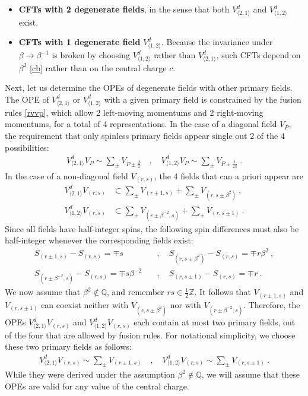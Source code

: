 \documentclass[12pt, a4paper]{article}
\theoremstyle{break}
\begin{document}
\begin{itemize}
 \item \textbf{CFTs with 2 degenerate fields}, in the sense that both $V^d_{\langle 2,1\rangle}$ and $V^d_{\langle 1,2\rangle}$ exist. 
 \item \textbf{CFTs with 1 degenerate field} $V^d_{\langle 1,2\rangle}$. Because the invariance under $\beta\to \beta^{-1}$ is broken by choosing $V^d_{\langle 1,2\rangle}$ rather than $V^d_{\langle 2,1\rangle}$, such CFTs depend on $\beta^2$ \eqref{cb} rather than on the central charge $c$. 
\end{itemize}
Next, let us determine the OPEs of degenerate fields with other primary fields.
The OPE of $V^d_{\langle 2,1\rangle}$ or $V^d_{\langle 1,2\rangle}$ with a given primary field is constrained by the fusion rules \eqref{rvvp}, which allow 2 left-moving momentums and 2 right-moving momentums, for a total of 4 representations.  In the case of a diagonal field $V_P$, the requirement that only spinless primary fields appear single out 2 of the 4 possibilities:
\begin{align}
 \boxed{V^d_{\langle 2,1\rangle} V_P \sim \sum_\pm V_{P\pm\frac{\beta}{2}}} \quad , \quad \boxed{V^d_{\langle 1,2\rangle} V_P \sim \sum_\pm V_{P\pm\frac{1}{2\beta}}} \ . 
 \label{vpope}
\end{align}
In the case of a non-diagonal field $V_{(r,s)}$, the 4 fields that can a priori appear are
\begin{align}
 V^d_{\langle 2,1\rangle}V_{(r,s)} &\subset \sum_\pm V_{(r\pm 1,s)} + \sum_\pm V_{(r,s\pm \beta^2)}\ ,
 \label{vtovrs}
 \\
 V^d_{\langle 1,2\rangle}V_{(r,s)} &\subset \sum_\pm V_{(r\pm \beta^{-2},s)} + \sum_\pm V_{(r,s\pm 1)}\ .
 \label{votvrs}
\end{align}
Since all fields have half-integer spins, the following spin differences must also be half-integer whenever the corresponding fields exist: 
\begin{align}
 S_{(r\pm 1,s)} - S_{(r,s)} = \mp s &\quad , \quad S_{(r,s\pm \beta^2)} - S_{(r,s)} = \mp r\beta^2\ ,
 \label{sdiff1}
 \\
 S_{(r\pm \beta^{-2},s)} - S_{(r,s)} = \mp s\beta^{-2} &\quad , \quad S_{(r,s\pm 1)} - S_{(r,s)} = \mp r\ . 
 \label{sdiff2}
\end{align}
We now assume that $\beta^2\notin \mathbb{Q}$, and remember $rs\in\frac12\mathbb{Z}$. It follows that $V_{(r\pm 1,s)}$ and $V_{(r,s\pm 1)}$ can coexist neither with $V_{(r,s\pm \beta^2)}$ nor with $V_{(r\pm \beta^{-2},s)}$. Therefore, the OPEs $V^d_{\langle 2,1\rangle}V_{(r,s)}$ and $V^d_{\langle 1,2\rangle}V_{(r,s)}$ each contain at most two primary fields, out of the four that are allowed by fusion rules. For notational simplicity, we choose these two primary fields as follows: 
\begin{align}
 \boxed{V^d_{\langle 2,1\rangle}V_{(r,s)} \sim \sum_\pm V_{(r\pm 1,s)}} \quad ,\quad
 \boxed{V^d_{\langle 1,2\rangle}V_{(r,s)} \sim \sum_\pm V_{(r,s\pm 1)}}\ . 
 \label{vdvrs}
\end{align}
While they were derived under the assumption $\beta^2\notin \mathbb{Q}$, we will assume that these OPEs are valid for any value of the central charge. 
\end{document}
